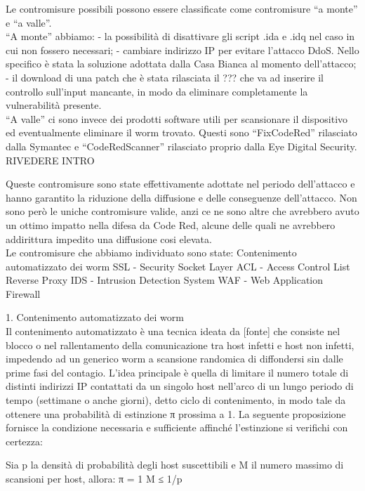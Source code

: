 Le contromisure possibili possono essere classificate come contromisure “a monte” e “a valle”.\\
“A monte” abbiamo:
- la possibilità di disattivare gli script .ida e .idq nel caso in cui non fossero necessari;
- cambiare indirizzo IP per evitare l’attacco DdoS. Nello specifico è stata la soluzione adottata dalla Casa Bianca al momento dell’attacco;\\
- il download di una patch che è stata rilasciata il ??? che va ad inserire il controllo sull’input mancante, in modo da eliminare completamente la vulnerabilità presente.\\

“A valle” ci sono invece dei prodotti software utili per scansionare il dispositivo ed eventualmente eliminare il worm trovato. Questi sono “FixCodeRed” rilasciato dalla Symantec e “CodeRedScanner” rilasciato proprio dalla Eye Digital Security.\\

RIVEDERE INTRO

Queste contromisure sono state effettivamente adottate nel periodo dell’attacco e hanno garantito la riduzione della diffusione e delle conseguenze dell’attacco. Non sono però le uniche contromisure valide, anzi ce ne sono altre che avrebbero avuto un ottimo impatto nella difesa da Code Red, alcune delle quali ne avrebbero addirittura impedito una diffusione cosi elevata.\\
Le contromisure che abbiamo individuato sono state:
Contenimento automatizzato dei worm    
SSL - Security Socket Layer
ACL - Access Control List
Reverse Proxy
IDS - Intrusion Detection System
WAF     - Web Application Firewall


1. Contenimento automatizzato dei worm\\
Il contenimento automatizzato è una tecnica ideata da [fonte] che consiste nel blocco o nel rallentamento della comunicazione tra host infetti e host non infetti, impedendo ad un generico worm a scansione randomica di diffondersi sin dalle prime fasi del contagio.
L’idea principale è quella di limitare il numero totale di distinti indirizzi IP contattati da un singolo host nell’arco di un lungo periodo di tempo (settimane o anche giorni), detto ciclo di contenimento, in modo tale da ottenere una probabilità di estinzione π prossima a 1.
La seguente proposizione fornisce la condizione necessaria e sufficiente affinché l’estinzione si verifichi con certezza:

Sia p la densità di probabilità degli host suscettibili e M il numero massimo di scansioni per host, allora:
π = 1  M ≤ 1/p 

